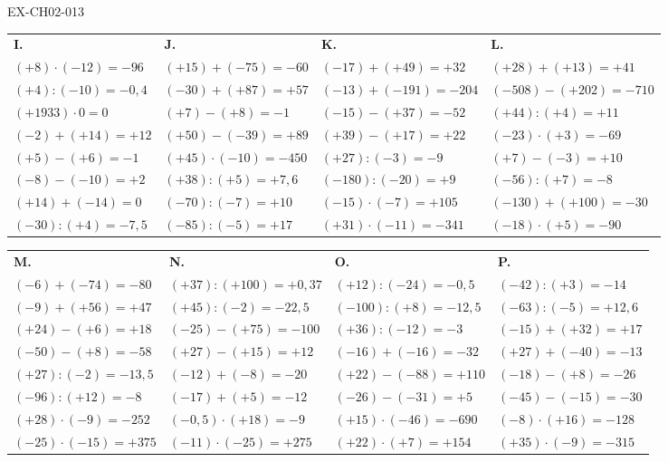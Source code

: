 \documentclass[12pt, a4paper]{article}
\begin{document}
\begin{solution}{EX-CH02-013}
\bigskip
\begin{tabularx}{\linewidth}{*{4}{X}}
\textbf{I.} & \textbf{J.} & \textbf{K.} & \textbf{L.} \\
$(+8)\cdot(-12)=-96$  & $(+15)+(-75)=-60$    & $(-17)+(+49)=+32$    & $(+28)+(+13)=+41$     \\
$(+4):(-10)=-0{,}4$   & $(-30)+(+87)=+57$    & $(-13)+(-191)=-204$  & $(-508)-(+202)=-710$  \\
$(+1933)\cdot 0=0$    & $(+7)-(+8)=-1$       & $(-15)-(+37)=-52$    & $(+44):(+4)=+11$      \\
$(-2)+(+14)=+12$      & $(+50)-(-39)=+89$    & $(+39)-(+17)=+22$    & $(-23)\cdot(+3)=-69$  \\
$(+5)-(+6)=-1$        & $(+45)\cdot(-10)=-450$& $(+27):(-3)=-9$     & $(+7)-(-3)=+10$       \\
$(-8)-(-10)=+2$       & $(+38):(+5)=+7{,}6$  & $(-180):(-20)=+9$    & $(-56):(+7)=-8$       \\
$(+14)+(-14)=0$       & $(-70):(-7)=+10$     & $(-15)\cdot(-7)=+105$& $(-130)+(+100)=-30$   \\
$(-30):(+4)=-7{,}5$   & $(-85):(-5)=+17$     & $(+31)\cdot(-11)=-341$& $(-18)\cdot(+5)=-90$ \\
\end{tabularx}

\bigskip
\begin{tabularx}{\linewidth}{*{4}{X}}
\textbf{M.} & \textbf{N.} & \textbf{O.} & \textbf{P.} \\
$(-6)+(-74)=-80$      & $(+37):(+100)=+0{,}37$ & $(+12):(-24)=-0{,}5$  & $(-42):(+3)=-14$      \\
$(-9)+(+56)=+47$      & $(+45):(-2)=-22{,}5$   & $(-100):(+8)=-12{,}5$ & $(-63):(-5)=+12{,}6$  \\
$(+24)-(+6)=+18$      & $(-25)-(+75)=-100$     & $(+36):(-12)=-3$      & $(-15)+(+32)=+17$     \\
$(-50)-(+8)=-58$      & $(+27)-(+15)=+12$      & $(-16)+(-16)=-32$     & $(+27)+(-40)=-13$     \\
$(+27):(-2)=-13{,}5$  & $(-12)+(-8)=-20$       & $(+22)-(-88)=+110$    & $(-18)-(+8)=-26$      \\
$(-96):(+12)=-8$      & $(-17)+(+5)=-12$       & $(-26)-(-31)=+5$      & $(-45)-(-15)=-30$     \\
$(+28)\cdot(-9)=-252$ & $(-0{,}5)\cdot(+18)=-9$& $(+15)\cdot(-46)=-690$& $(-8)\cdot(+16)=-128$ \\
$(-25)\cdot(-15)=+375$& $(-11)\cdot(-25)=+275$ & $(+22)\cdot(+7)=+154$ & $(+35)\cdot(-9)=-315$ \\
\end{tabularx}

\end{solution}
\end{document}
